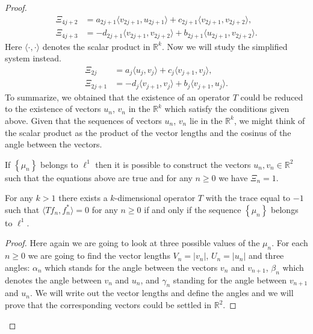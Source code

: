 \documentclass[12pt]{amsart}
\theoremstyle{case}
\begin{document}
\begin{proof}
\begin{align*}
        \Xi_{4j + 2} &= a_{2j+1} \langle v_{2j+1}, u_{2j+1} \rangle + c_{2j+1} \langle v_{2j+1}, v_{2j+2} \rangle,\\
        \Xi_{4j + 3} &= -d_{2j+1} \langle v_{2j+1}, v_{2j+2}\rangle + b_{2j+1} \langle u_{2j+1}, v_{2j+2} \rangle.
      \end{align*}
      Here $\langle\cdot, \cdot\rangle$ denotes the scalar product in $\mathbb{R}^k$.
      Now we will study the simplified system instead.
      \begin{align*}
        \Xi_{2j} &= a_{j} \langle u_{j}, v_{j} \rangle  + c_{j} \langle v_{j+1}, v_{j} \rangle,\\
        \Xi_{2j + 1} &= -d_{j} \langle v_{j+1}, v_{j} \rangle + b_{j} \langle v_{j+1}, u_{j}\rangle.
      \end{align*}
      To summarize, we obtained that the existence of an operator $T$ could be reduced to the existence of vectors $u_n$, $v_n$ in the $\mathbb{R}^k$
        which satisfy the conditions given above.
      Given that the sequences of vectors $u_n$, $v_n$ lie in the $\mathbb{R}^k$, we might think of the scalar product as
        the product of the vector lengths and the cosinus of the angle between the vectors.
      \begin{prop}
        \label{k-dim-statement}
        If $\left\{\mu_n\right\}$ belongs to $\ell^1$ then it is possible to construct the vectors $u_n, v_n \in \mathbb{R}^2$ such that
          the equations above are true and for any $n \geq 0$ we have $\Xi_n = 1$.
      \end{prop}
      \begin{corol*}
        For any $k > 1$ there exists a $k$-dimensional operator $T$ with the trace equal to $-1$ such that $\langle Tf_n, f_n^*\rangle = 0$ for any $n \geq 0$
          if and only if the sequence $\left\{\mu_n\right\}$ belongs to $\ell^1$.
      \end{corol*}
      \begin{proof}
        Here again we are going to look at three possible values of the $\mu_n$.
        For each $n \geq 0$ we are going to find the vector lengths $V_n = |v_n|$, $U_n = |u_n|$ and three angles:
          $\alpha_n$ which stands for the angle between the vectors $v_n$ and $v_{n + 1}$,
          $\beta_n$ which denotes the angle between $v_n$ and $u_n$,
          and $\gamma_n$ standing for the angle between $v_{n + 1}$ and $u_n$.
        We will write out the vector lengths and define the angles and we will prove that the corresponding vectors could be settled in $\mathbb{R}^2$.


\end{proof}
\end{proof}
\end{document}
